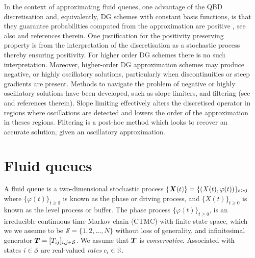 
In the context of approximating fluid queues, one advantage of the QBD discretisation and, equivalently, DG schemes with constant basis functions, is that they guarantee probabilities computed from the approximation are positive \citep[Section 3.3]{koltai2011}, see also \citep{nodalDGBook} and references therein. One justification for the positivity preserving property is from the interpretation of the discretisation as a stochastic process thereby ensuring positivity. For higher order DG schemes there is no such interpretation. Moreover, higher-order DG approximation schemes may produce negative, or highly oscillatory solutions, particularly when discontinuities or steep gradients are present. Methods to navigate the problem of negative or highly oscillatory solutions have been developed, such as slope limiters, and filtering (see \citep[Section 6.5]{nodalDGBook} and references therein). Slope limiting effectively alters the discretised operator in regions where oscillations are detected and lowers the order of the approximation in theses regions. Filtering is a post-hoc method which looks to recover an accurate solution, given an oscillatory approximation. 

\section{Fluid queues}
A fluid queue is a two-dimensional stochastic process \(\{\boldsymbol X(t)\} = \{(X(t),\varphi(t))\}_{t\geq0}\) where \(\{\varphi(t)\}_{t\geq0}\) is known as the phase or driving process, and \(\{X(t)\}_{t\geq0}\) is known as the level process or buffer. The phase process \(\{\varphi(t)\}_{t\geq0}\), is an irreducible continuous-time Markov chain (CTMC) with finite state space, which we we assume to be \(\mathcal S=\{1,2,\dots,N\}\) without loss of generality, and infinitesimal generator \(\boldsymbol T= [T_{ij}]_{i,j\in\mathcal S}\). We assume that \(\boldsymbol T\) is \emph{conservative}. Associated with states \(i\in\mathcal S\) are real-valued \emph{rates} \(c_i\in\mathbb R\). 

